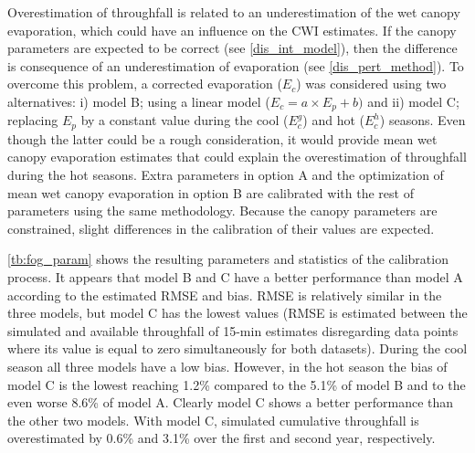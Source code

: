 \documentclass[a4paper,12pt]{article}
\begin{document}
\begin{linenumbers}
Overestimation of throughfall is related to an underestimation of the wet canopy evaporation, which could have an influence on the CWI estimates. If the canopy parameters are expected to be correct (see \autoref{dis_int_model}), then the difference is consequence of an underestimation of evaporation (see \autoref{dis_pert_method}). To overcome this problem, a corrected evaporation ($E_c$) was considered using two alternatives: i) model B; using a linear model ($E_c = a \times E_p + b)$ and ii) model C; replacing $E_p$ by a constant value during the cool ($E^g_c$) and hot ($E^h_c$) seasons. Even though the latter could be a rough consideration, it would provide mean wet canopy evaporation estimates that could explain the overestimation of throughfall during the hot seasons. Extra parameters in option A and the optimization of mean wet canopy evaporation in option B are calibrated with the rest of parameters using the same methodology. Because the canopy parameters are constrained, slight differences in the calibration of their values are expected. 

\autoref{tb:fog_param} shows the resulting parameters and statistics of the calibration process. It appears that model B and C have a better performance than model A according to the estimated RMSE and bias. RMSE is relatively similar in the three models, but model C has the lowest values (RMSE is estimated between the simulated and available throughfall of 15-min estimates disregarding data points where its value is equal to zero simultaneously for both datasets). During the cool season all three models have a low bias. However, in the hot season the bias of model C is the lowest reaching 1.2\% compared to the 5.1\% of model B and to the even worse 8.6\% of model A. Clearly model C shows a better performance than the other two models. With model C, simulated cumulative throughfall is overestimated by 0.6\% and 3.1\% over the first and second year, respectively.





\end{linenumbers}
\end{document}
